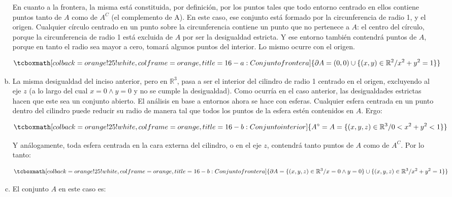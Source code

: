 \documentclass{article}
\renewcommand{\Bbb}{\mathbb}
\begin{document}
\begin{enumerate}[(a)]
En cuanto a la frontera, la misma está constituida, por definición, por los puntos tales que todo entorno centrado en ellos contiene puntos tanto de $A$ como de $A^C$ (el complemento de A). En este caso, ese conjunto está formado por la circunferencia de radio 1, y el origen. Cualquier círculo centrado en un punto sobre la circunferencia contiene un punto que no pertenece a $A$: el centro del círculo, porque la circunferencia de radio 1 está excluida de $A$ por ser la desigualdad estricta. Y ese entorno también contendrá puntos de $A$, porque en tanto el radio sea mayor a cero, tomará algunos puntos del interior. Lo mismo ocurre con el origen.

\begin{equation}
\tcboxmath[colback=orange!25!white,colframe=orange, title=16-a: Conjunto frontera]
{ \partial{A} = (0,0) \cup \{ (x,y) \in \Bbb R^2 / x^2 + y^2 = 1 \}  }
\end{equation}

\item La misma desigualdad del inciso anterior, pero en $\Bbb R^3$, pasa a ser el interior del cilindro de radio 1 centrado en el origen, excluyendo al eje $z$ (a lo largo del cual $x = 0 \wedge y = 0$ y no se cumple la desigualdad). Como ocurría en el caso anterior, las desigualdades estrictas hacen que este sea un conjunto abierto. El análisis en base a entornos ahora se hace con esferas. Cualquier esfera centrada en un punto dentro del cilindro puede reducir su radio de manera tal que todos los puntos de la esfera estén contenidos en $A$. Ergo:

\begin{equation}
\tcboxmath[colback=orange!25!white,colframe=orange, title=16-b: Conjunto interior]
{ A^{\circ} = A = \{ (x, y, z) \in \Bbb R^3 / 0 < x^2 + y^2 < 1 \}  }
\end{equation}

Y análogamente, toda esfera centrada en la cara externa del cilindro, o en el eje $z$, contendrá tanto puntos de $A$ como de $A^C$. Por lo tanto:

\begin{equation}
\tcboxmath[colback=orange!25!white,colframe=orange, title=16-b: Conjunto frontera]
{ \partial{A} = \{(x, y, z) \in \Bbb R^3 / x = 0 \wedge y = 0 \} \cup \{ (x, y, z) \in \Bbb R^3 / x^2 + y^2 = 1 \}  }
\end{equation}

\item El conjunto $A$ en este caso es:


\end{enumerate}
\end{document}
